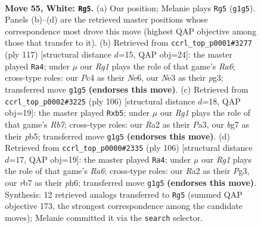 \documentclass[11pt]{article}
\begin{document}
\clearpage

\begin{figure}[p]\centering
\begin{subfigure}{0.46\textwidth}\centering
\resizebox{\linewidth}{!}{%
\newchessgame
\chessboard[
  setfen={6k1/1r4b1/8/8/2P5/4N2K/R7/6R1 w - - 30 55},
  showmover=false,
  pgfstyle=straightmove, color=movearrow, markmove={g1-g5}
]}
\caption{}
\end{subfigure}\hfill
\begin{subfigure}{0.46\textwidth}\centering
\resizebox{\linewidth}{!}{%
\newchessgame
\chessboard[
  setfen={8/8/4nk2/3R4/8/r2BK1P1/8/8 b - - 16 59},
  showmover=false,
  pgfstyle=straightmove, color=movearrow, markmove={a3-a4}
]}
\caption{}
\end{subfigure}
\\[4pt]
\begin{subfigure}{0.46\textwidth}\centering
\resizebox{\linewidth}{!}{%
\newchessgame
\chessboard[
  setfen={8/1R6/4k3/1p2b2r/1P6/P7/2K5/8 w - - 0 54},
  showmover=false,
  pgfstyle=straightmove, color=movearrow, markmove={b7-b5}
]}
\caption{}
\end{subfigure}\hfill
\begin{subfigure}{0.46\textwidth}\centering
\resizebox{\linewidth}{!}{%
\newchessgame
\chessboard[
  setfen={8/5k1b/R4b1p/8/8/6P1/7K/8 w - - 12 54},
  showmover=false,
  pgfstyle=straightmove, color=movearrow, markmove={a6-a4}
]}
\caption{}
\end{subfigure}
\caption{\textbf{Move 55, White: \texttt{Rg5}.} (a) Our position; Melanie plays \texttt{Rg5} (\texttt{g1g5}). Panels (b)--(d) are the retrieved master positions whose correspondence most drove this move (highest QAP objective among those that transfer to it). (b) Retrieved from \texttt{ccrl\_top\_p0001\#3277} (ply 117) [structural distance $d$=15, QAP obj=24]: the master played \texttt{Ra4}; under $\mu$ our \emph{Rg1} plays the role of that game's \emph{Ra6}; cross-type roles: our \emph{P}c4 as their \emph{N}e6, our \emph{N}e3 as their \emph{p}g3; transferred move \texttt{g1g5} \textbf{(endorses this move)}. (c) Retrieved from \texttt{ccrl\_top\_p0002\#3225} (ply 106) [structural distance $d$=18, QAP obj=19]: the master played \texttt{Rxb5}; under $\mu$ our \emph{Rg1} plays the role of that game's \emph{Rb7}; cross-type roles: our \emph{R}a2 as their \emph{P}a3, our \emph{b}g7 as their \emph{p}b5; transferred move \texttt{g1g5} \textbf{(endorses this move)}. (d) Retrieved from \texttt{ccrl\_top\_p0000\#2335} (ply 106) [structural distance $d$=17, QAP obj=19]: the master played \texttt{Ra4}; under $\mu$ our \emph{Rg1} plays the role of that game's \emph{Ra6}; cross-type roles: our \emph{R}a2 as their \emph{P}g3, our \emph{r}b7 as their \emph{p}h6; transferred move \texttt{g1g5} \textbf{(endorses this move)}. Synthesis: 12 retrieved analogs transferred to \texttt{Rg5} (summed QAP objective 173, the strongest correspondence among the candidate moves); Melanie committed it via the \texttt{search} selector.}
\label{fig:thought-m108}
\end{figure}
\end{document}
